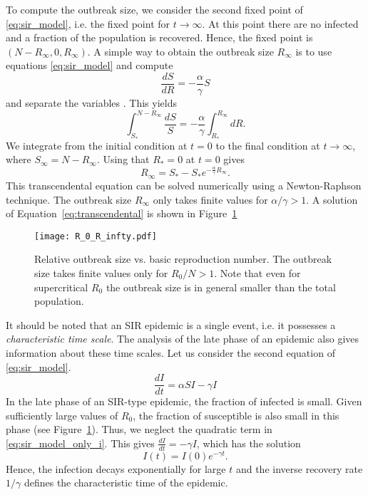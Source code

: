 To compute the outbreak size, we consider the second fixed point of \eqref{eq:sir_model}, i.e. the fixed point for $t \rightarrow \infty $.
At this point there are no infected and a fraction of the population is recovered.
Hence, the fixed point is $(N-R_\infty , 0, R_\infty )$.
A simple way to obtain the outbreak size $R_\infty $ is to use equations \eqref{eq:sir_model} and compute 
\[
\frac{dS}{dR}=-\frac{\alpha }{\gamma } S 
\]
and separate the variables \citep{Chasnov:2010}.
This yields
\[
\int _{S_*} ^{N-R_\infty} \frac{dS}{S}=-\frac{\alpha }{\gamma } \int _{R_*} ^{R_\infty} dR .
\]
We integrate from the initial condition at $t=0$ to the final condition at $t \rightarrow \infty$, where $S_\infty = N-R_\infty $.
Using that $R_* =0$ at $t=0$ gives 
\begin{equation}\label{eq:transcendental}
R_\infty = S_*-S_* e ^{-\frac{\alpha}{\gamma}R_\infty}.
\end{equation}
This transcendental equation can be solved numerically using a Newton-Raphson technique.
The outbreak size $R_\infty $ only takes finite values for $\alpha / \gamma > 1$.
A solution of Equation~\eqref{eq:transcendental} is shown in Figure~\ref{fig:transcendental}
%
\begin{figure}[htbp]
\begin{center}
\texttt{[image: R\_0\_R\_infty.pdf]}
\caption{Relative outbreak size vs. basic reproduction number.
The outbreak size takes finite values only for $R_0/N >1$.
Note that even for supercritical $R_0$ the outbreak size is in general smaller than the total population.
}
\label{fig:transcendental}
\end{center}
\end{figure}

It should be noted that an SIR epidemic is a single event, i.e. it possesses a \emph{characteristic time scale}.
The analysis of the late phase of an epidemic also gives information about these time scales.
Let us consider the second equation of \eqref{eq:sir_model}.
\begin{equation}\label{eq:sir_model_only_i}
\frac{dI}{dt} = \alpha SI -\gamma I
\end{equation}
In the late phase of an SIR-type epidemic, the fraction of infected is small.
Given sufficiently large values of $R_0$, the fraction of susceptible is also small in this phase (see Figure~\ref{fig:transcendental}).
Thus, we neglect the quadratic term in \eqref{eq:sir_model_only_i}.
This gives $\frac{dI}{dt} = -\gamma I $, which has the solution
\begin{equation}\label{eq:sir_characteristic_time_scale_gamma}
I(t)=I(0)e^{-\gamma t}.
\end{equation}
Hence, the infection decays exponentially for large $t$ and the inverse recovery rate $1/\gamma $ defines the characteristic time of the epidemic.

